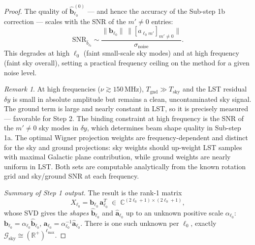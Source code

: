 \documentclass{aastex631}
\newcommand{\Tgnd}{T_\mathrm{gnd}}
\newcommand{\lmax}{\ell_\mathrm{max}}
\theoremstyle{plain}
\theoremstyle{remark}
\newtheorem{remark}{Remark}
\begin{document}
\begin{proof}
The quality of $\hat{\mathbf{b}}^{(0)}_{\ell_0}$ --- and hence the
accuracy of the Sub-step 1b correction --- scales with the SNR of the
$m' \neq 0$ entries:
\begin{equation}
  \mathrm{SNR}_{\hat{b}_{\ell_0}}
  \sim
  \frac{\|\mathbf{b}_{\ell_0}\|\,\|[a_{\ell_0 m'}]_{m'\neq 0}\|}
       {\sigma_\mathrm{noise}}.
\end{equation}
This degrades at high $\ell_0$ (faint small-scale sky modes) and
at high frequency (faint sky overall), setting a practical frequency
ceiling on the method for a given noise level.

\begin{remark}
At high frequencies ($\nu \gtrsim 150$\,MHz), $\Tgnd \gg T_\mathrm{sky}$
and the LST residual $\delta y$ is small in absolute amplitude but
remains a clean, uncontaminated sky signal.
The ground term is large and nearly constant in LST, so it is
precisely measured --- favorable for Step 2.
The binding constraint at high frequency is the SNR of the $m' \neq 0$
sky modes in $\delta y$, which determines beam shape quality
in Sub-step 1a.
The optimal Wigner projection weights are frequency-dependent and
distinct for the sky and ground projections: sky weights should
up-weight LST samples with maximal Galactic plane contribution,
while ground weights are nearly uniform in LST.
Both sets are computable analytically from the known rotation grid
and sky/ground SNR at each frequency.
\end{remark}

\textit{Summary of Step 1 output.}
The result is the rank-1 matrix
\begin{equation}
  X_{\ell_0} = \mathbf{b}_{\ell_0}\,\mathbf{a}_{\ell_0}^T
  \;\in\; \mathbb{C}^{(2\ell_0+1)\times(2\ell_0+1)},
\end{equation}
whose SVD gives the \emph{shapes} $\hat{\mathbf{b}}_{\ell_0}$ and
$\hat{\mathbf{a}}_{\ell_0}$ up to an unknown positive scale
$\alpha_{\ell_0}$:
$\mathbf{b}_{\ell_0} = \alpha_{\ell_0}\hat{\mathbf{b}}_{\ell_0}$,
$\mathbf{a}_{\ell_0} = \alpha_{\ell_0}^{-1}\hat{\mathbf{a}}_{\ell_0}$.
There is one such unknown per $\ell_0$, exactly
$\mathcal{G}_\mathrm{sky} \cong (\mathbb{R}^+)^{\lmax}$.


\end{proof}
\end{document}
